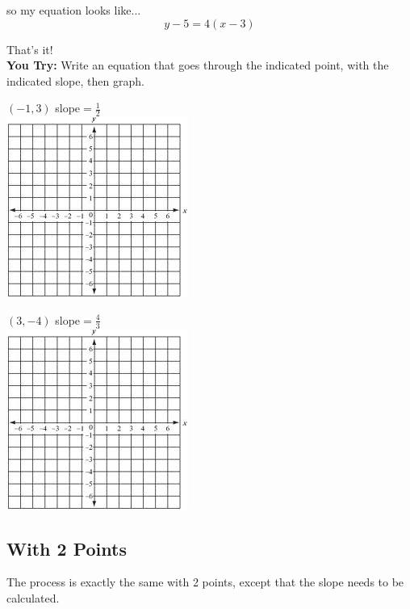 \documentclass[12pt]{article}
\begin{document}
so my equation looks like...\\

$$y-5=4(x-3)$$ 

That's it!\\

\textbf{You Try:} Write an equation that goes through the indicated point, with the indicated slope, then graph.

\begin{multicols}{2}

$(-1,3)$ slope$=\frac{1}{2}$\\

\includegraphics[scale=.9]{graphing.jpg}

$(3,-4)$ slope$=\frac{4}{3}$\\

\includegraphics[scale=.9]{graphing.jpg}

\end{multicols}

\pagebreak


\subsection*{With 2 Points}

The process is exactly the same with 2 points, except that the slope needs to be calculated. \\
\end{document}
